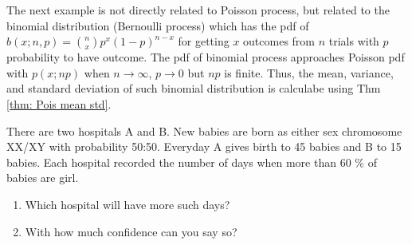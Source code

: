 The next example is not directly related to Poisson process, but related to the binomial distribution (Bernoulli process) which has the pdf of $ b(x; n, p) = \binom{n}{x} p^x (1 - p)^{n - x} $ for getting $ x $ outcomes from $ n $ trials with $ p $ probability to have outcome. The pdf of binomial process approaches Poisson pdf with $ p(x; np) $ when $ n \rightarrow \infty $, $ p \rightarrow 0 $ but $ np $ is finite. Thus, the mean, variance, and standard deviation of such binomial distribution is calculabe using Thm \ref{thm: Pois mean std}.
\begin{ex}
There are two hospitals A and B. New babies are born as either sex chromosome XX/XY with probability 50:50. Everyday A gives birth to 45 babies and B to 15 babies. Each hospital recorded the number of days when more than 60 \% of babies are girl.
\begin{enumerate}
\item Which hospital will have more such days?
\item With how much confidence can you say so?
\end{enumerate}
\end{ex}





